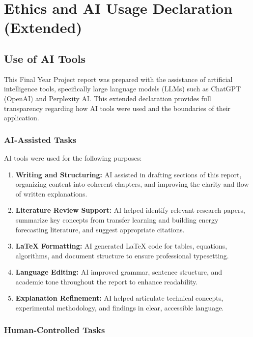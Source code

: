 \documentclass[12pt,a4paper]{report}
\begin{document}
\chapter{Ethics and AI Usage Declaration (Extended)}

\section{Use of AI Tools}

This Final Year Project report was prepared with the assistance of artificial intelligence tools, specifically large language models (LLMs) such as ChatGPT (OpenAI) and Perplexity AI. This extended declaration provides full transparency regarding how AI tools were used and the boundaries of their application.

\subsection{AI-Assisted Tasks}

AI tools were used for the following purposes:

\begin{enumerate}
    \item \textbf{Writing and Structuring:} AI assisted in drafting sections of this report, organizing content into coherent chapters, and improving the clarity and flow of written explanations.
    
    \item \textbf{Literature Review Support:} AI helped identify relevant research papers, summarize key concepts from transfer learning and building energy forecasting literature, and suggest appropriate citations.
    
    \item \textbf{LaTeX Formatting:} AI generated LaTeX code for tables, equations, algorithms, and document structure to ensure professional typesetting.
    
    \item \textbf{Language Editing:} AI improved grammar, sentence structure, and academic tone throughout the report to enhance readability.
    
    \item \textbf{Explanation Refinement:} AI helped articulate technical concepts, experimental methodology, and findings in clear, accessible language.
\end{enumerate}

\subsection{Human-Controlled Tasks}
\end{document}
